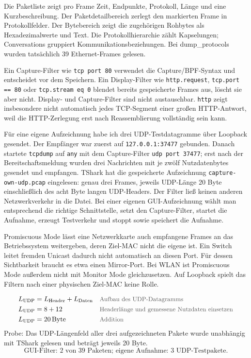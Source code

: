 \documentclass[a4paper,11pt]{article}
\newif\ifexplain
\newcommand{\why}[1]{\text{\small\color{black!65}#1}}
\newcommand{\explain}[1]{\ifexplain\begin{erklbox}#1\end{erklbox}\fi}
\begin{document}
Die Paketliste zeigt pro Frame Zeit, Endpunkte, Protokoll, Länge und eine Kurzbeschreibung. Der Paketdetailbereich zerlegt den markierten Frame in Protokollfelder. Der Bytebereich zeigt die zugehörigen Rohbytes als Hexadezimalwerte und Text. Die Protokollhierarchie zählt Kapselungen; Conversations gruppiert Kommunikationsbeziehungen. Bei dump\_protocols wurden tatsächlich 39 Ethernet-Frames gelesen.

Ein Capture-Filter wie \texttt{tcp port 80} verwendet die Capture/BPF-Syntax und entscheidet vor dem Speichern. Ein Display-Filter wie \texttt{http.request}, \texttt{tcp.port == 80} oder \texttt{tcp.stream eq 0} blendet bereits gespeicherte Frames aus, löscht sie aber nicht. Display- und Capture-Filter sind nicht austauschbar. \texttt{http} zeigt insbesondere nicht automatisch jedes TCP-Segment einer großen HTTP-Antwort, weil die HTTP-Zerlegung erst nach Reassemblierung vollständig sein kann.

Für eine eigene Aufzeichnung habe ich drei UDP-Testdatagramme über Loopback gesendet. Der Empfänger war zuerst auf \texttt{127.0.0.1:37477} gebunden. Danach startete \texttt{tcpdump} auf \texttt{any} mit dem Capture-Filter \texttt{udp port 37477}; erst nach der Bereitschaftsmeldung wurden drei Nachrichten mit je zwölf Nutzdatenbytes gesendet und empfangen. TShark hat die gespeicherte Aufzeichnung \texttt{capture-own-udp.pcap} eingelesen: genau drei Frames, jeweils UDP-Länge 20 Byte einschließlich des acht Byte langen UDP-Headers. Der Filter ließ keinen anderen Netzwerkverkehr in die Datei. Bei einer eigenen GUI-Aufzeichnung wählt man entsprechend die richtige Schnittstelle, setzt den Capture-Filter, startet die Aufnahme, erzeugt Testverkehr und stoppt sowie speichert die Aufnahme.

Promiscuous Mode lässt eine Netzwerkkarte auch empfangene Frames an das Betriebssystem weitergeben, deren Ziel-MAC nicht die eigene ist. Ein Switch leitet fremden Unicast dadurch nicht automatisch an diesen Port. Für dessen Sichtbarkeit braucht es etwa einen Mirror-Port. Bei WLAN ist Promiscuous Mode außerdem nicht mit Monitor Mode gleichzusetzen. Auf Loopback spielt das Filtern nach einer physischen Ziel-MAC keine Rolle.
\explain{Ein Display-Filter wirkt wie eine Ansicht auf vorhandene Daten. Wenn der Capture-Filter ein Paket gar nicht gespeichert hat, kann ein späterer Display-Filter es nicht zurückholen. Die eigene Aufzeichnung wurde deshalb absichtlich eng begrenzt. TShark überprüft den tatsächlichen Mitschnitt; die GUI zeigt ergänzend, welche Felder zu den beiden HTTP-Nachrichten gehören.}
\begin{align*}
L_{\mathrm{UDP}}&=L_{\mathrm{Header}}+L_{\mathrm{Daten}} &&\why{Aufbau des UDP-Datagramms}\\
L_{\mathrm{UDP}}&=8+12 &&\why{Headerlänge und gemessene Nutzdaten einsetzen}\\
L_{\mathrm{UDP}}&=20\,\mathrm{Byte} &&\why{Addition}
\end{align*}
Probe: Das UDP-Längenfeld aller drei aufgezeichneten Pakete wurde unabhängig mit TShark gelesen und beträgt jeweils 20 Byte.
\[\boxed{\text{GUI-Filter: 2 von 39 Paketen; eigene Aufnahme: 3 UDP-Testpakete.}}\]
\end{document}
